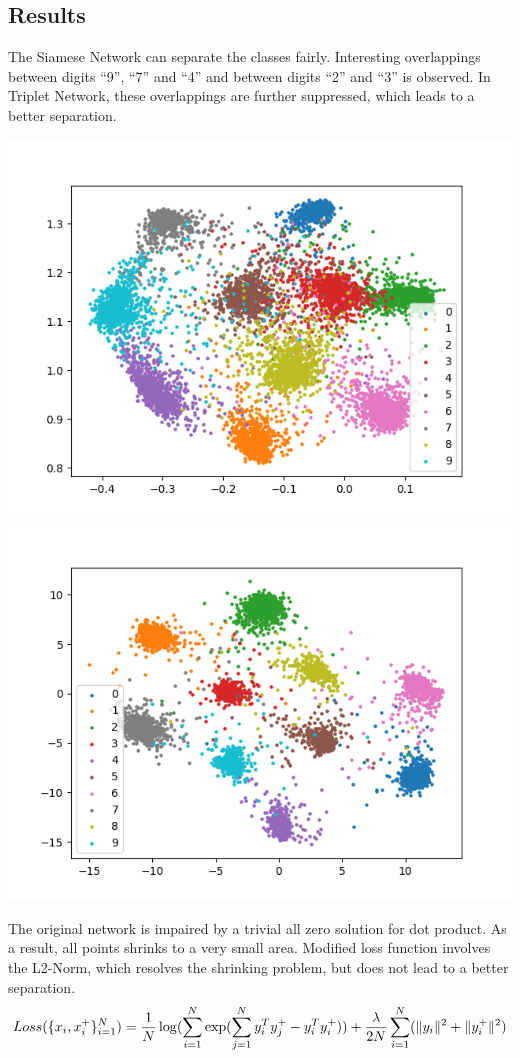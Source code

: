 \documentclass[a0,portrait]{a0poster}
\begin{document}
\begin{multicols}{2}
		\section*{Results}
		The Siamese Network can separate the classes fairly. Interesting overlappings between digits ``9'', ``7'' and ``4'' and between digits ``2'' and ``3'' is observed. In Triplet Network, these overlappings are further suppressed, which leads to a better separation.
		\begin{center}\vspace{1cm}
			\includegraphics[width=0.45\linewidth]{../report_shaoheng/siamese}
			\includegraphics[width=0.45\linewidth]{../report_shaoheng/triplet}
		\end{center}\vspace{1cm}
		
		The original network is impaired by a trivial all zero solution for dot product. As a result, all points shrinks to a very small area. Modified loss function involves the L2-Norm, which resolves the shrinking problem, but does not lead to a better separation.
		\begin{equation}
		Loss(\{x_i,x_i^+\}^N_{i=1})\notag
		=\frac{1}{N}\log(\sum_{i=1}^N\exp(\sum_{j=1}^Ny^T_iy_j^+-y_i^Ty_i^+))+ \frac{\lambda}{2N} \sum_{i=1}^N(\lVert y_i\rVert^2+ \lVert y^+_i\rVert^2)
		\end{equation}
		

\end{multicols}
\end{document}
